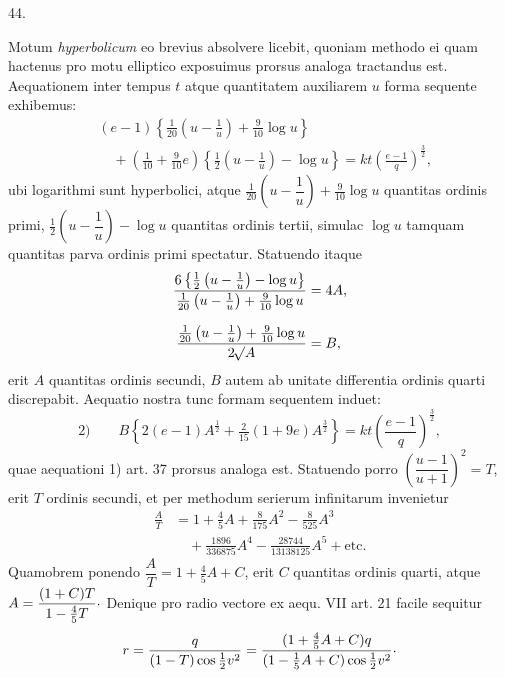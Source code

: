 \begin{center}
\hypertarget{native-061-article044}{}44.
\end{center}
Motum \emph{hyperbolicum} eo brevius absolvere licebit, quoniam methodo ei quam hactenus pro motu elliptico exposuimus prorsus analoga tractandus est. Aequationem inter tempus $t$ atque quantitatem auxiliarem $u$ forma sequente exhibemus:
\[
\begin{aligned}
&(e-1)\left\{\tfrac{1}{20}\left(u-\frac{1}{u}\right)+\tfrac{9}{10}\log u\right\}\\
&\quad+\left(\tfrac{1}{10}+\tfrac{9}{10}e\right)\left\{\tfrac{1}{2}\left(u-\frac{1}{u}\right)-\log u\right\}=kt\left(\frac{e-1}{q}\right)^{\frac{3}{2}},
\end{aligned}
\]
\noindent ubi logarithmi sunt hyperbolici, atque $\tfrac{1}{20}\left(u-\dfrac{1}{u}\right)+\tfrac{9}{10}\log u$ quantitas ordinis primi, $\tfrac{1}{2}\left(u-\dfrac{1}{u}\right)-\log u$ quantitas ordinis tertii, simulac $\log u$ tamquam quantitas parva ordinis primi spectatur. Statuendo itaque
\[
\begin{aligned}
\frac{6\left\{\tfrac{1}{2}\left(u-\frac{1}{u}\right)-\log u\right\}}{\tfrac{1}{20}\left(u-\frac{1}{u}\right)+\tfrac{9}{10}\log u}&=4A,\\[.7em]
\frac{\tfrac{1}{20}\left(u-\frac{1}{u}\right)+\tfrac{9}{10}\log u}{2\mathord{{}^{}\!\surd}A}&=B,
\end{aligned}
\]
\noindent{}erit $A$ quantitas ordinis secundi, $B$ autem ab unitate differentia ordinis quarti discrepabit. Aequatio nostra tunc formam sequentem induet:
\[
\text{2)}\qquad B\left\{2(e-1)A^{\frac{1}{2}}+\tfrac{2}{15}(1+9e)A^{\frac{3}{2}}\right\}=kt\left(\frac{e-1}{q}\right)^{\frac{3}{2}},
\]
\noindent quae aequationi 1) art. 37 prorsus analoga est. Statuendo porro $\left(\dfrac{u-1}{u+1}\right)^2=T$, erit $T$ ordinis secundi, et per methodum serierum infinitarum invenietur
\[
\begin{aligned}
\frac{A}{T}&=1+\tfrac{4}{5}A+\tfrac{8}{175}A^2-\tfrac{8}{525}A^3\\
&\quad+\tfrac{1896}{336875}A^4-\tfrac{28744}{13138125}A^5+\text{etc.}
\end{aligned}
\]
\noindent Quamobrem ponendo $\dfrac{A}{T}=1+\tfrac{4}{5}A+C$, erit $C$ quantitas ordinis quarti, atque $A=\dfrac{(1+C)T}{1-\tfrac{4}{5}T}\mathord{\raisebox{.35ex}{.}}$ Denique pro radio vectore ex aequ. VII art. 21 facile sequitur
\[
r=\frac{q}{(1-T)\cos\tfrac{1}{2}v^2}=\frac{(1+\tfrac{4}{5}A+C)q}{(1-\tfrac{1}{5}A+C)\cos\tfrac{1}{2}v^2}\mathord{\raisebox{.35ex}{.}}
\]
